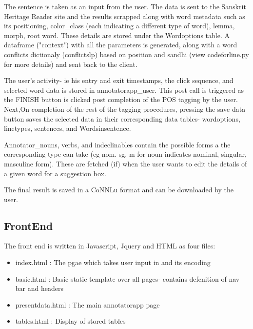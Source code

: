 \documentclass[12pt]{article}
\begin{document}
The sentence is taken as an input from the user. The data is sent to the Sanskrit Heritage Reader site and the results scrapped along with word metadata such as its positioning, color\_class (each indicating a different type of word), lemma, morph, root word. These details are stored under the Wordoptions table. A dataframe ("context") with all the parameters is generated, along with a word conflicts dictionaly (conflictslp) based on position and sandhi (view codeforline.py for more details) and sent back to the client.

The user's activity- ie his entry and exit timestamps, the click sequence, and selected word data is stored in annotatorapp\_user. This post call is triggered as the FINISH button is clicked post completion of the POS tagging by the user. Next,On completion of the rest of the tagging procedures, pressing the save data button saves the selected data in their corresponding data tables- wordoptions, linetypes, sentences, and Wordsinsentence. 

Annotator\_nouns, verbs, and indeclinables contain the possible forms a the corresponding type can take (eg nom. sg. m for noun indicates nominal, singular, masculine form). These are fetched (if) when the user wants to edit the details of a given word for a suggestion box. 

The final result is saved in a CoNNLu format and can be downloaded by the user.

\subsection{FrontEnd}
The front end is written in Javascript, Jquery and HTML as four files:
\begin{itemize}
	\item index.html : The pgae which takes user input in and its encoding
	\item basic.html : Basic static template over all pages- contains defenition of nav bar and headers
	\item presentdata.html : The main annotatorapp page
	\item tables.html : Display of stored tables
\end{itemize}
\end{document}
